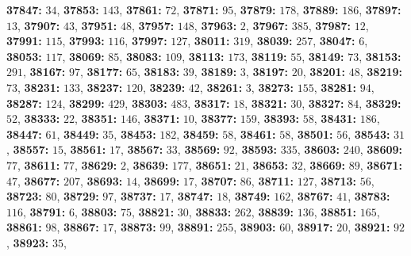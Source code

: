 \textsf{\bfseries 37847:} $34$, \textsf{\bfseries 37853:} $143$, \textsf{\bfseries 37861:} $72$, \textsf{\bfseries 37871:} $95$, \textsf{\bfseries 37879:} $178$, \textsf{\bfseries 37889:} $186$, \textsf{\bfseries 37897:} $13$, \textsf{\bfseries 37907:} $43$, \textsf{\bfseries 37951:} $48$, \textsf{\bfseries 37957:} $148$, \textsf{\bfseries 37963:} $2$, \textsf{\bfseries 37967:} $385$, \textsf{\bfseries 37987:} $12$, \textsf{\bfseries 37991:} $115$, \textsf{\bfseries 37993:} $116$, \textsf{\bfseries 37997:} $127$, \textsf{\bfseries 38011:} $319$, \textsf{\bfseries 38039:} $257$, \textsf{\bfseries 38047:} $6$, \textsf{\bfseries 38053:} $117$, \textsf{\bfseries 38069:} $85$, \textsf{\bfseries 38083:} $109$, \textsf{\bfseries 38113:} $173$, \textsf{\bfseries 38119:} $55$, \textsf{\bfseries 38149:} $73$, \textsf{\bfseries 38153:} $291$, \textsf{\bfseries 38167:} $97$, \textsf{\bfseries 38177:} $65$, \textsf{\bfseries 38183:} $39$, \textsf{\bfseries 38189:} $3$, \textsf{\bfseries 38197:} $20$, \textsf{\bfseries 38201:} $48$, \textsf{\bfseries 38219:} $73$, \textsf{\bfseries 38231:} $133$, \textsf{\bfseries 38237:} $120$, \textsf{\bfseries 38239:} $42$, \textsf{\bfseries 38261:} $3$, \textsf{\bfseries 38273:} $155$, \textsf{\bfseries 38281:} $94$, \textsf{\bfseries 38287:} $124$, \textsf{\bfseries 38299:} $429$, \textsf{\bfseries 38303:} $483$, \textsf{\bfseries 38317:} $18$, \textsf{\bfseries 38321:} $30$, \textsf{\bfseries 38327:} $84$, \textsf{\bfseries 38329:} $52$, \textsf{\bfseries 38333:} $22$, \textsf{\bfseries 38351:} $146$, \textsf{\bfseries 38371:} $10$, \textsf{\bfseries 38377:} $159$, \textsf{\bfseries 38393:} $58$, \textsf{\bfseries 38431:} $186$, \textsf{\bfseries 38447:} $61$, \textsf{\bfseries 38449:} $35$, \textsf{\bfseries 38453:} $182$, \textsf{\bfseries 38459:} $58$, \textsf{\bfseries 38461:} $58$, \textsf{\bfseries 38501:} $56$, \textsf{\bfseries 38543:} $31$, \textsf{\bfseries 38557:} $15$, \textsf{\bfseries 38561:} $17$, \textsf{\bfseries 38567:} $33$, \textsf{\bfseries 38569:} $92$, \textsf{\bfseries 38593:} $335$, \textsf{\bfseries 38603:} $240$, \textsf{\bfseries 38609:} $77$, \textsf{\bfseries 38611:} $77$, \textsf{\bfseries 38629:} $2$, \textsf{\bfseries 38639:} $177$, \textsf{\bfseries 38651:} $21$, \textsf{\bfseries 38653:} $32$, \textsf{\bfseries 38669:} $89$, \textsf{\bfseries 38671:} $47$, \textsf{\bfseries 38677:} $207$, \textsf{\bfseries 38693:} $14$, \textsf{\bfseries 38699:} $17$, \textsf{\bfseries 38707:} $86$, \textsf{\bfseries 38711:} $127$, \textsf{\bfseries 38713:} $56$, \textsf{\bfseries 38723:} $80$, \textsf{\bfseries 38729:} $97$, \textsf{\bfseries 38737:} $17$, \textsf{\bfseries 38747:} $18$, \textsf{\bfseries 38749:} $162$, \textsf{\bfseries 38767:} $41$, \textsf{\bfseries 38783:} $116$, \textsf{\bfseries 38791:} $6$, \textsf{\bfseries 38803:} $75$, \textsf{\bfseries 38821:} $30$, \textsf{\bfseries 38833:} $262$, \textsf{\bfseries 38839:} $136$, \textsf{\bfseries 38851:} $165$, \textsf{\bfseries 38861:} $98$, \textsf{\bfseries 38867:} $17$, \textsf{\bfseries 38873:} $99$, \textsf{\bfseries 38891:} $255$, \textsf{\bfseries 38903:} $60$, \textsf{\bfseries 38917:} $20$, \textsf{\bfseries 38921:} $92$, \textsf{\bfseries 38923:} $35$, 
